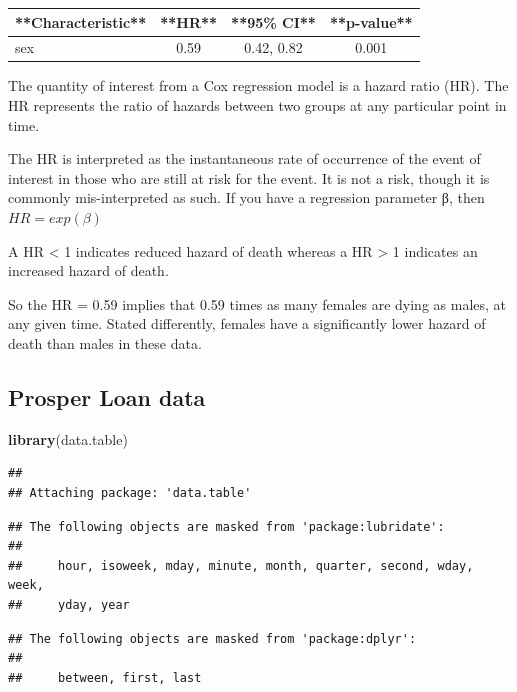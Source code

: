 \documentclass[
]{book}
\newenvironment{Shaded}{\begin{snugshade}}{\end{snugshade}}
\newcommand{\FunctionTok}[1]{\textcolor[rgb]{0.13,0.29,0.53}{\textbf{#1}}}
\newcommand{\NormalTok}[1]{#1}
\begin{document}
\begin{tabular}{l|c|c|c}
\hline
**Characteristic** & **HR** & **95\% CI** & **p-value**\\
\hline
sex & 0.59 & 0.42, 0.82 & 0.001\\
\hline
\end{tabular}

The quantity of interest from a Cox regression model is a hazard ratio (HR). The HR represents the ratio of hazards between two groups at any particular point in time.

The HR is interpreted as the instantaneous rate of occurrence of the event of interest in those who are still at risk for the event. It is not a risk, though it is commonly mis-interpreted as such. If you have a regression parameter β, then \(HR = exp(β)\)

A HR \textless{} 1 indicates reduced hazard of death whereas a HR \textgreater{} 1 indicates an increased hazard of death.

So the HR = 0.59 implies that 0.59 times as many females are dying as males, at any given time. Stated differently, females have a significantly lower hazard of death than males in these data.

\hypertarget{prosper-loan-data}{%
\subsection{Prosper Loan data}\label{prosper-loan-data}}

\begin{Shaded}
\begin{Highlighting}[]
\FunctionTok{library}\NormalTok{(data.table)}
\end{Highlighting}
\end{Shaded}

\begin{verbatim}
## 
## Attaching package: 'data.table'
\end{verbatim}

\begin{verbatim}
## The following objects are masked from 'package:lubridate':
## 
##     hour, isoweek, mday, minute, month, quarter, second, wday, week,
##     yday, year
\end{verbatim}

\begin{verbatim}
## The following objects are masked from 'package:dplyr':
## 
##     between, first, last
\end{verbatim}
\end{document}
